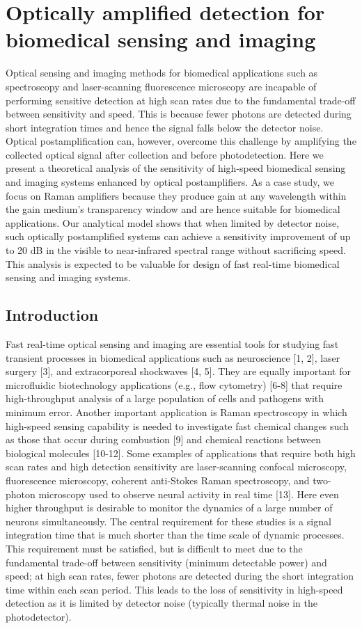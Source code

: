 \chapter{Optically amplified detection for biomedical sensing and imaging}

Optical sensing and imaging methods for biomedical applications such as spectroscopy and laser-scanning fluorescence microscopy are incapable of performing sensitive detection at high scan rates due to the fundamental trade-off between sensitivity and speed. This is because fewer photons are detected during short integration times and hence the signal falls below the detector noise. Optical postamplification can, however, overcome this challenge by amplifying the collected optical signal after collection and before photodetection. Here we present a theoretical analysis of the sensitivity of high-speed biomedical sensing and imaging systems enhanced by optical postamplifiers. As a case study, we focus on Raman amplifiers because they produce gain at any wavelength within the gain medium’s transparency window and are hence suitable for biomedical applications. Our analytical model shows that when limited by detector noise, such optically postamplified systems can achieve a sensitivity improvement of up to 20 dB in the visible to near-infrared spectral range without sacrificing speed. This analysis is expected to be valuable for design of fast real-time biomedical sensing and imaging systems.

\section{Introduction}

Fast real-time optical sensing and imaging are essential tools for studying fast transient processes in biomedical applications such as neuroscience [1, 2], laser surgery [3], and extracorporeal shockwaves [4, 5]. They are equally important for microfluidic biotechnology applications (e.g., flow cytometry) [6-8] that require high-throughput analysis of a large population of cells and pathogens with minimum error. Another important application is Raman spectroscopy in which high-speed sensing capability is needed to investigate fast chemical changes such as those that occur during combustion [9] and chemical reactions between biological molecules [10-12]. Some examples of applications that require both high scan rates and high detection sensitivity are laser-scanning confocal microscopy, fluorescence microscopy, coherent anti-Stokes Raman spectroscopy, and two-photon microscopy used to observe neural activity in real time [13]. Here even higher throughput is desirable to monitor the dynamics of a large number of neurons simultaneously.
The central requirement for these studies is a signal integration time that is much shorter than the time scale of dynamic processes. This requirement must be satisfied, but is difficult to meet due to the fundamental trade-off between sensitivity (minimum detectable power) and speed; at high scan rates, fewer photons are detected during the short integration time within each scan period. This leads to the loss of sensitivity in high-speed detection as it is limited by detector noise (typically thermal noise in the photodetector).


